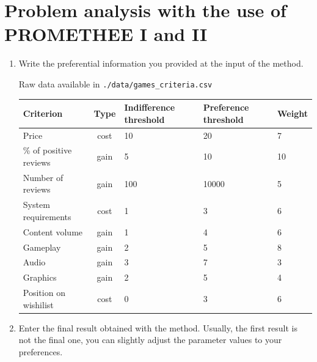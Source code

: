 \documentclass{article}
\begin{document}

\clearpage

\section{Problem analysis with the use of PROMETHEE I and II}

\begin{enumerate}

    \item Write the preferential information you provided at the input of the method.

    Raw data available in \verb|./data/games_criteria.csv|

    \begin{center}
    \begin{tabular}{l|c|m{6em}|m{6em}|l}
    Criterion & Type & Indifference threshold & Preference threshold & Weight \\
    \hline
    \hline
    Price & cost & 10 & 20 & 7 \\
    \% of positive reviews & gain & 5 & 10 & 10 \\
    Number of reviews & gain & 100 & 10000 & 5 \\
    System requirements & cost & 1 & 3 & 6 \\
    Content volume & gain & 1 & 4 & 6 \\
    Gameplay & gain & 2 & 5 & 8 \\
    Audio & gain & 3 & 7 & 3 \\
    Graphics & gain & 2 & 5 & 4 \\
    Position on wishilist & cost & 0 & 3 & 6 \\

    \end{tabular}
    \end{center}

    \item Enter the final result obtained with the method. Usually, the first result is not the final one, you can
    slightly adjust the parameter values to your preferences.



\end{enumerate}
\end{document}
